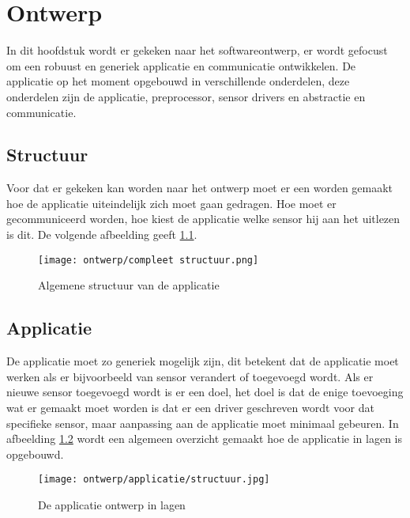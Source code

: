 \chapter{Ontwerp}
In dit hoofdstuk wordt er gekeken naar het softwareontwerp, er wordt gefocust om een robuust en generiek applicatie en communicatie ontwikkelen. De applicatie op het moment opgebouwd in verschillende onderdelen, deze onderdelen zijn de applicatie, preprocessor, sensor drivers en abstractie en communicatie.

\section{Structuur}
Voor dat er gekeken kan worden naar het ontwerp moet er een worden gemaakt hoe de applicatie uiteindelijk zich moet gaan gedragen. Hoe moet er gecommuniceerd worden, hoe kiest de applicatie welke sensor hij aan het uitlezen is dit. De volgende afbeelding geeft \ref{fig:appstructuur}. 
\begin{figure}[h!]
	\centering
	\label{fig:appstructuur}
	\caption{Algemene structuur van de applicatie}
	\texttt{[image: ontwerp/compleet structuur.png]}
\end{figure}

\newpage
\section{Applicatie}
De applicatie moet zo generiek mogelijk zijn, dit betekent dat de applicatie moet werken als er bijvoorbeeld van sensor verandert of toegevoegd wordt. Als er nieuwe sensor toegevoegd wordt is er een doel, het doel is dat de enige toevoeging wat er gemaakt moet worden is dat er een driver geschreven wordt voor dat specifieke sensor, maar aanpassing aan de applicatie moet minimaal gebeuren. In afbeelding \ref{fig:appontwerp} wordt een algemeen overzicht gemaakt hoe de applicatie in lagen is opgebouwd. 
\begin{figure}[h!]
	\centering
	\label{fig:appontwerp}
	\caption{De applicatie ontwerp in lagen}
	\texttt{[image: ontwerp/applicatie/structuur.jpg]}
\end{figure}



